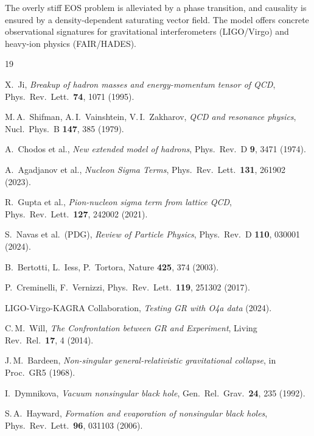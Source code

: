 \documentclass[11pt,a4paper]{article}
\begin{document}
The overly stiff EOS problem is alleviated by a phase transition, and causality is ensured by a density-dependent saturating vector field. The model offers concrete observational signatures for gravitational interferometers (LIGO/Virgo) and heavy-ion physics (FAIR/HADES).

\begin{thebibliography}{19}

X.~Ji,
\emph{Breakup of hadron masses and energy-momentum tensor of QCD},
Phys.\ Rev.\ Lett.\ \textbf{74}, 1071 (1995).

M.\,A.~Shifman, A.\,I.~Vainshtein, V.\,I.~Zakharov,
\emph{QCD and resonance physics},
Nucl.\ Phys.\ B \textbf{147}, 385 (1979).

A.~Chodos et al.,
\emph{New extended model of hadrons},
Phys.\ Rev.\ D \textbf{9}, 3471 (1974).

A.~Agadjanov et al.,
\emph{Nucleon Sigma Terms},
Phys.\ Rev.\ Lett.\ \textbf{131}, 261902 (2023).

R.~Gupta et al.,
\emph{Pion-nucleon sigma term from lattice QCD},
Phys.\ Rev.\ Lett.\ \textbf{127}, 242002 (2021).

S.~Navas et al.\ (PDG),
\emph{Review of Particle Physics},
Phys.\ Rev.\ D \textbf{110}, 030001 (2024).

B.~Bertotti, L.~Iess, P.~Tortora,
Nature \textbf{425}, 374 (2003).

P.~Creminelli, F.~Vernizzi,
Phys.\ Rev.\ Lett.\ \textbf{119}, 251302 (2017).

LIGO-Virgo-KAGRA Collaboration,
\emph{Testing GR with O4a data} (2024).

C.\,M.~Will,
\emph{The Confrontation between GR and Experiment},
Living Rev.\ Rel.\ \textbf{17}, 4 (2014).

J.\,M.~Bardeen,
\emph{Non-singular general-relativistic gravitational collapse},
in Proc.\ GR5 (1968).

I.~Dymnikova,
\emph{Vacuum nonsingular black hole},
Gen.\ Rel.\ Grav.\ \textbf{24}, 235 (1992).

S.\,A.~Hayward,
\emph{Formation and evaporation of nonsingular black holes},
Phys.\ Rev.\ Lett.\ \textbf{96}, 031103 (2006).


\end{thebibliography}
\end{document}
